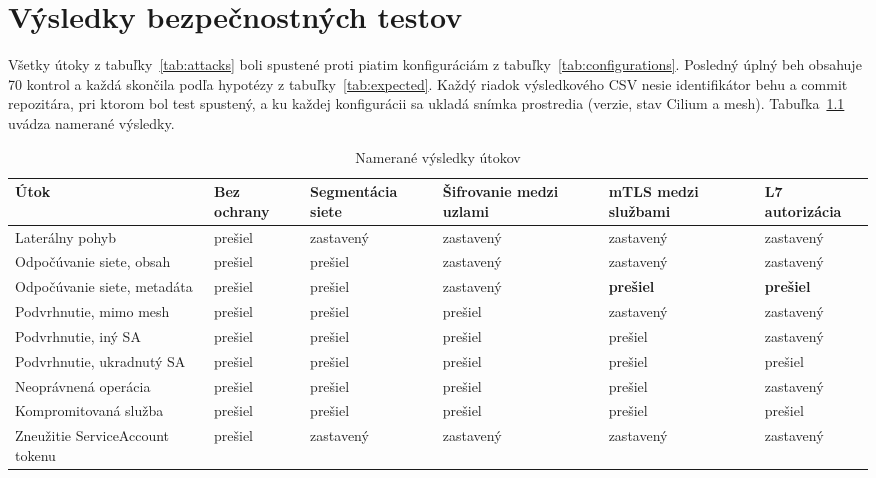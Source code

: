 \chapter{Výsledky bezpečnostných testov}
\label{ch:security-results}

Všetky útoky z tabuľky~\ref{tab:attacks} boli spustené proti piatim konfiguráciám z tabuľky~\ref{tab:configurations}. Posledný úplný beh obsahuje 70 kontrol a každá skončila podľa hypotézy z tabuľky~\ref{tab:expected}. Každý riadok výsledkového CSV nesie identifikátor behu a commit repozitára, pri ktorom bol test spustený, a ku každej konfigurácii sa ukladá snímka prostredia (verzie, stav Cilium a mesh). Tabuľka~\ref{tab:measured} uvádza namerané výsledky.

\begin{table}[ht!]
  \centering
  \caption{Namerané výsledky útokov}
  \label{tab:measured}
  \footnotesize
  \renewcommand{\arraystretch}{1.15}
  \begin{tabularx}{\textwidth}{@{}>{\raggedright\arraybackslash}X>{\centering\arraybackslash}p{1.65cm}>{\centering\arraybackslash}p{1.65cm}>{\centering\arraybackslash}p{1.65cm}>{\centering\arraybackslash}p{1.65cm}>{\centering\arraybackslash}p{1.65cm}@{}}
    \toprule
    Útok & Bez ochrany & Segmen\-tácia siete & Šifrovanie medzi uzlami & mTLS medzi službami & L7 autori\-zácia \\
    \midrule
    Laterálny pohyb & prešiel & zastavený & zastavený & zastavený & zastavený \\
    Odpočúvanie siete, obsah & prešiel & prešiel & zastavený & zastavený & zastavený \\
    Odpočúvanie siete, metadáta & prešiel & prešiel & zastavený & \textbf{prešiel} & \textbf{prešiel} \\
    Podvrhnutie, mimo mesh & prešiel & prešiel & prešiel & zastavený & zastavený \\
    Podvrhnutie, iný SA & prešiel & prešiel & prešiel & prešiel & zastavený \\
    Podvrhnutie, ukradnutý SA & prešiel & prešiel & prešiel & prešiel & prešiel \\
    Neoprávnená operácia & prešiel & prešiel & prešiel & prešiel & zastavený \\
    Kompromitovaná služba & prešiel & prešiel & prešiel & prešiel & prešiel \\
    Zneužitie ServiceAccount tokenu & prešiel & zastavený & zastavený & zastavený & zastavený \\
    \bottomrule
  \end{tabularx}
\end{table}

